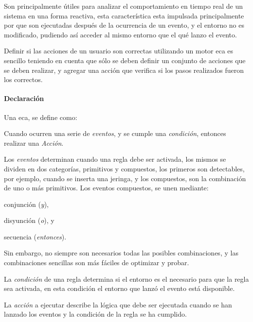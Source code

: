 Son principalmente útiles para analizar el comportamiento en tiempo real de un
sistema en una forma
reactiva\cite{bailey2004event,de2001eca,bailey2002analysis}, esta característica
esta impulsada principalmente por que son ejecutadas después de la ocurrencia de
un evento, y el entorno no es modificado, pudiendo así acceder al mismo entorno
que el qué lanzo el evento.

Definir si las acciones de un usuario son correctas utilizando un motor
\gls{eca} es sencillo teniendo en cuenta que sólo se deben definir un
conjunto de acciones que se deben realizar, y agregar una acción que verifica si
los pasos realizados fueron los correctos.

\paragraph{Declaración}

Una \gls{eca}, se define como\cite{bailey2004event,behrends2006combining}:

\begin{displayquote}
	 Cuando ocurren una serie de \emph{eventos}, y se cumple una
	 \emph{condición}, entonces realizar una \emph{Acción}.
\end{displayquote}

Los \emph{eventos} determinan cuando una regla debe ser activada, los mismos se
dividen en dos categorías\cite{behrends2006combining}, primitivos y compuestos,
los primeros son detectables, por ejemplo, cuando se inserta una jeringa, y los
compuestos, son la combinación de uno o más
primitivos\cite{bailey2004event,behrends2006combining}. Los eventos
compuestos, se unen mediante:
\begin{enumerate*}[label=\itshape\alph*\upshape)]
\item conjunción (\emph{y}),
\item disyunción (\emph{o}), y
\item secuencia (\emph{entonces}).
\end{enumerate*}
Sin embargo, no siempre son necesarios todas las posibles combinaciones, y las
combinaciones sencillas son más fáciles de optimizar y
probar\cite{bailey2004event}.

La \emph{condición} de una regla determina si el entorno es el necesario para que la
regla sea activada, en esta condición el entorno que lanzó el evento está
disponible.

La \emph{acción} a ejecutar describe la lógica que debe ser ejecutada cuando se han
lanzado los eventos y la condición de la regla se ha cumplido.

